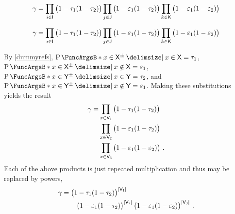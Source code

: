 \documentclass[11pt,final,hidelinks]{article}
\begin{document}
\begin{equation}
\tsr =
\prod_{i \in \Set{I}}
\left(1 - \tprate_1
(1 - \tprate_2)\right)
\prod_{j \in \Set{J}}
\left(1 - \fprate_1
(1 - \tprate_2)\right)
\prod_{k \in \Set{K}}
\left(1 - \fprate_1
(1 - \fprate_2)\right)
\end{equation}



\begin{equation}
\tsr =
\prod_{i \in \Set{I}}
\left(1 - \tprate_1
(1 - \tprate_2)\right)
\prod_{j \in \Set{J}}
\left(1 - \fprate_1
(1 - \tprate_2)\right)
\prod_{k \in \Set{K}}
\left(1 - \fprate_1
(1 - \fprate_2)\right)
\end{equation}



By \cref{dummyrefs}, $\Prob{x \in \ASet{X} \Given x \in \Set{X}} = \tprate_1$, 
$\Prob{x \in \ASet{X} \Given x \notin \Set{X}} = \fprate_1$, $\Prob{x \in 
	\ASet{Y} \Given x \in \Set{Y}} = \tprate_2$, and $\Prob{x \in \ASet{Y} \Given x 
	\notin \Set{Y}} = \fprate_1$. Making these substitutions yields the result
\begin{equation}
\begin{split}
\tsr =
&\prod_{x \in \Set{V}[1]}
\left(1 -
\tprate_1
(1 - \tprate_2)
\right)\\
&\prod_{x \in \Set{V}[2]}
\left(1 -
\fprate_1
(1 - \tprate_2)
\right)\\
&\prod_{x \in \Set{V}[3]}
\left(1 -
\fprate_1
(1 - \fprate_2)
\right)\,.  
\end{split}    
\end{equation}
Each of the above products is just repeated multiplication and thus may be 
replaced by powers,
\begin{equation}
\begin{split}
\tsr &=
\left(1 - \tprate_1(1 - \tprate_2)\right)^{\Card{\Set{V}[1]}}\\
&\qquad \left(1 - \fprate_1(1 - \tprate_2)\right)^{\Card{\Set{V}[2]}}
\left(1 - \fprate_1(1 - \fprate_2)\right)^{\Card{\Set{V}[3]}}\,.  
\end{split}
\end{equation}

% 
% 
%
\end{document}
